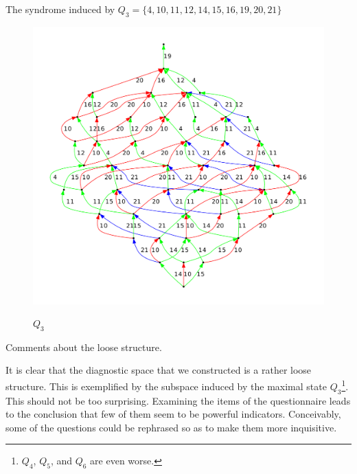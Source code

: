 \documentclass{beamer}
\def\wl{\vskip 4mm}
\begin{document}
\begin{frame}{\small The syndrome induced by  $Q_3 = \{4,10,11,12,14, 15,16,19,20,21\}$}

\begin{figure}
\vspace{-5.6cm}


\includegraphics[scale=.38]{M3_5_28_16.pdf}
\vspace{-8.7cm}

{\bf $Q_3$}

\end{figure}
 \vspace{-.5cm}

\end{frame}
\begin{frame}{Comments about the loose structure.}
\center
\begin{minipage}{10.5cm} It is clear that the diagnostic space that we constructed is a rather loose structure. This is exemplified by the subspace induced by the maximal state $Q_3$\footnote{$Q_4$, $Q_5$, and $Q_6$ are even worse.}. This should not be too surprising. Examining the items of the questionnaire leads to the conclusion that few of them seem to be powerful indicators. Conceivably, some of the questions could be rephrased so as to make them more inquisitive. 
\wl
\wl
\wl
\wl
\wl
\wl
 \vspace{.5cm}

\end{minipage}

\end{frame}
\end{document}
